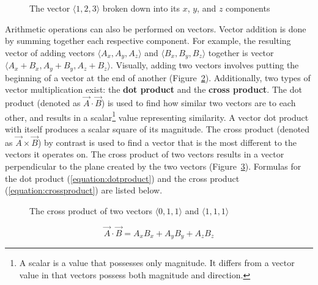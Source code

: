 \documentclass[a4paper]{article}
\begin{document}
\begin{figure}[htp]
    \centering
    
    \caption{The vector $\langle 1, 2, 3 \rangle$ broken down into its $x$, $y$, and $z$ components}\label{figure:vectorcomponents}
\end{figure}

Arithmetic operations can also be performed on vectors. Vector addition is done by summing together each respective component. For example, the resulting vector of adding vectors $\langle A_{x}, A_{y}, A_{z} \rangle$ and $\langle B_{x}, B_{y}, B_{z} \rangle$ together is vector $\langle A_{x} + B_{x}, A_{y} + B_{y}, A_{z} + B_{z} \rangle$. Visually, adding two vectors involves putting the beginning of a vector at the end of another (Figure~\ref{figure:vectorAddition}). Additionally, two types of vector multiplication exist: the \textbf{dot product} and the \textbf{cross product}. The dot product (denoted as $\vec{A} \cdot \vec{B}$) is used to find how similar two vectors are to each other, and results in a scalar\footnote{A scalar is a value that possesses only magnitude. It differs from a vector value in that vectors possess both magnitude and direction.} value representing similarity. A vector dot product with itself produces a scalar square of its magnitude. The cross product (denoted as $\vec{A} \times \vec{B}$) by contrast is used to find a vector that is the most different to the vectors it operates on. The cross product of two vectors results in a vector perpendicular to the plane created by the two vectors (Figure~\ref{v011&111crossproduct}). Formulas for the dot product (\ref{equation:dotproduct}) and the cross product (\ref{equation:crossproduct}) are listed below.

\begin{figure}[htp]
    \centering
    \caption{}\label{figure:vectorAddition}
\end{figure}

\begin{figure}[htp]
    \centering
    
    \caption{The cross product of two vectors $\langle 0, 1, 1 \rangle$ and $\langle 1, 1, 1 \rangle$}\label{v011&111crossproduct}
\end{figure}

\begin{equation}\label{equation:dotproduct}
    \vec{A} \cdot \vec{B} = A_{x}B_{x} + A_{y}B_{y} + A_{z}B_{z}
\end{equation}
\end{document}
